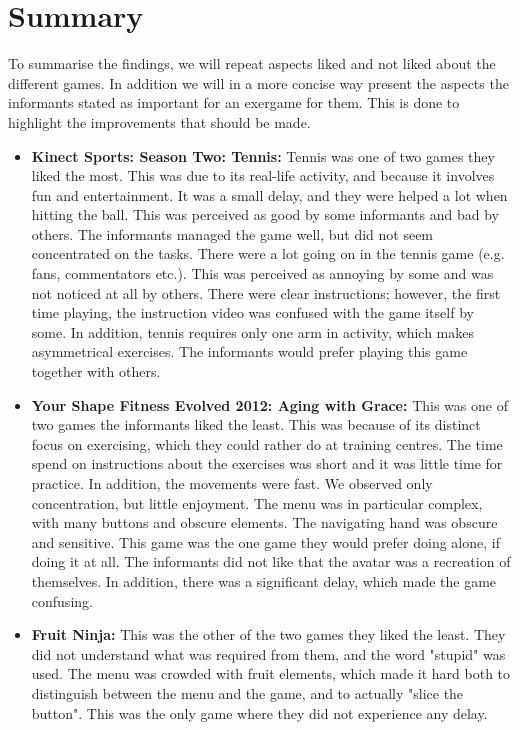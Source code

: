\section{Summary}
To summarise the findings, we will repeat aspects liked and not liked about the different games. In addition we will in a more concise way present the aspects the informants stated as important for an exergame for them. This is done to highlight the improvements that should be made.

\begin{itemize}
\item \textbf{Kinect Sports: Season Two: Tennis:} Tennis was one of two games they liked the most. This was due to its real-life activity, and because it involves fun and entertainment. It was a small delay, and they were helped a lot when hitting the ball. This was perceived as good by some informants and bad by others. The informants managed the game well, but did not seem concentrated on the tasks. There were a lot going on in the tennis game (e.g. fans, commentators etc.). This was perceived as annoying by some and was not noticed at all by others. There were clear instructions; however, the first time playing, the instruction video was confused with the game itself by some. In addition, tennis requires only one arm in activity, which makes asymmetrical exercises. The informants would prefer playing this game together with others. 

\item \textbf{Your Shape Fitness Evolved 2012: Aging with Grace:} This was one of two games the informants liked the least. This was because of its distinct focus on exercising, which they could rather do at training centres.  The time spend on instructions about the exercises was short and it was little time for practice. In addition, the movements were fast.  We observed only concentration, but little enjoyment. The menu was in particular complex, with many buttons and obscure elements. The navigating hand was obscure and sensitive. This game was the one game they would prefer doing alone, if doing it at all. The informants did not like that the avatar was a recreation of themselves. In addition, there was a significant delay, which made the game confusing.

\item \textbf{Fruit Ninja:} This was the other of the two games they liked the least.  They did not understand what was required from them, and the word "stupid" was used. The menu was crowded with fruit elements, which made it hard both to distinguish between the menu and the game, and to actually "slice the button". This was the only game where they did not experience any delay.


\end{itemize}
